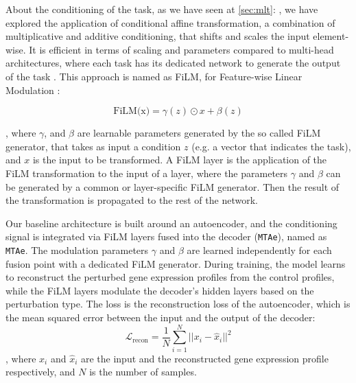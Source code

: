 \documentclass[12pt, a4paper]{article}
\newcommand{\crefwithname}[1]{\cref{#1}: \nameref{#1}}
\begin{document}
About the conditioning of the task, as we have seen at \crefwithname{sec:mlt}, we have explored the application of conditional affine transformation, a combination of multiplicative and additive conditioning, that shifts and scales the input element-wise. It is efficient in terms of scaling and parameters compared to multi-head architectures, where each task has its dedicated network to generate the output of the task . This approach is named as FiLM, for Feature-wise Linear Modulation \cite{dumoulin2018feature-wise, perez2018film}:

\[ \text{FiLM(x)} = \gamma (z) \odot x + \beta (z) \]

, where $\gamma$, and $\beta$ are learnable parameters generated by the so called FiLM generator, that takes as input a condition $z$ (e.g. a vector that indicates the task), and $x$ is the input to be transformed. 
A FiLM layer is the application of the FiLM transformation to the input of a layer, where the parameters $\gamma$ and $\beta$ can be generated by a common or layer-specific FiLM generator.   Then the result of the transformation is propagated to the rest of the network.





Our baseline architecture is built around an autoencoder, and the conditioning signal is integrated via FiLM layers fused into the decoder (\verb|MTAe|), named as \verb|MTAe|. The modulation parameters $\gamma$ and $\beta$ are learned independently for each fusion point with a dedicated FiLM generator.
During training, the model learns to reconstruct the perturbed gene expression profiles from the control profiles, while the FiLM layers modulate the decoder's hidden layers based on the perturbation type.
The loss is the reconstruction loss of the autoencoder, which is the mean squared error between the input and the output of the decoder:
\[
\mathcal{L}_{\text{recon}} = \frac{1}{N} \sum_{i=1}^{N} ||x_i - \hat{x}_i||^2 \]
, where $x_i$ and $\hat{x}_i$ are the input and the reconstructed gene expression profile respectively, and $N$ is the number of samples.
\end{document}
